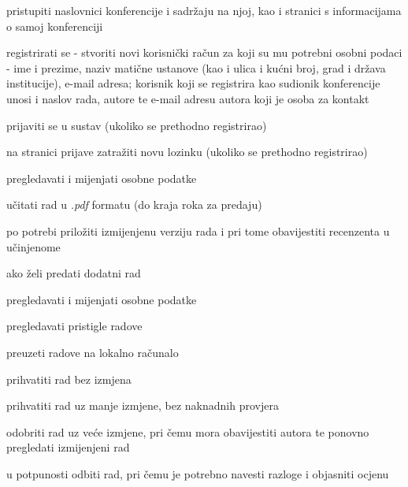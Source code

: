 			
			\begin{packed_enum}
					\item  {}
				
				\begin{packed_enum}
					
					\item pristupiti naslovnici konferencije i sadržaju na njoj, kao i stranici s informacijama o samoj konferenciji
					\item registrirati se - stvoriti novi korisnički račun za koji su mu potrebni osobni podaci - ime i prezime, naziv matične ustanove (kao i ulica i kućni broj, grad i država institucije), e-mail adresa; korisnik koji se registrira kao sudionik konferencije unosi i naslov rada, autore te e-mail adresu autora koji je osoba za kontakt 
					\item prijaviti se u sustav (ukoliko se prethodno registrirao)
					\item na stranici prijave zatražiti novu lozinku (ukoliko se prethodno registrirao)
					
				\end{packed_enum}
			 	\item  {}
			 
			 	\begin{packed_enum}
					\item  {}
				
					\begin{packed_enum}
					
						\item pregledavati i mijenjati osobne podatke 
						\item učitati rad u \textit{.pdf} formatu (do kraja roka za predaju)
						\item po potrebi priložiti izmijenjenu verziju rada i pri tome obavijestiti recenzenta u učinjenome
						\item ako želi predati dodatni rad 
					
					
					\end{packed_enum}
				
					\item  {}
				
					\begin{packed_enum}
					
						\item pregledavati i mijenjati osobne podatke 
						\item pregledavati pristigle radove
						\item preuzeti radove na lokalno računalo
						\item prihvatiti rad bez izmjena
						\item prihvatiti rad uz manje izmjene, bez naknadnih provjera
						\item odobriti rad uz veće izmjene, pri čemu mora obavijestiti autora te ponovno pregledati izmijenjeni rad
						\item u potpunosti odbiti rad, pri čemu je potrebno navesti razloge i objasniti ocjenu
					

\end{packed_enum}
\end{packed_enum}
\end{packed_enum}
